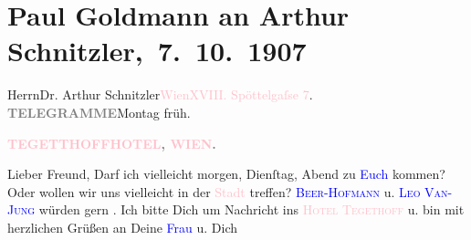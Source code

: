 

\renewcommand{\erwaehntePersonen}{Personen: Richard Beer-Hofmann, Olga Schnitzler, Leo Van-Jung}
\renewcommand{\erwaehnteOrte}{Orte: Edmund-Weiß-Gasse, Hotel Tegetthoff, Wien}
\renewcommand{\erwaehnteWerke}{}
\section[ Paul Goldmann an Arthur Schnitzler, 7. 10. 1907]{Paul Goldmann an Arthur Schnitzler, 7. 10. 1907}
\nopagebreak{}
\rehead{ }\normalsize\beginnumbering{}
\toendnotes[C]{\smallbreak\pagebreak[2]}
\toendnotes[C]{\smallbreak}\pstart{}{\pb}Herrn\pend{}\pstart{}Dr. Arthur Schnitzler\pend{}\pstart{}\textcolor{pink}{Wien}{}\ledrightnote{\textcolor{pink}{Wien}}\pend{}\pstart{}\textcolor{pink}{XVIII. Spöttelgaſse 7}{}\ledrightnote{\textcolor{pink}{Edmund-Weiß-Gasse}}.\pend{}
{\bigskip}
\pstart
           \noindent{}{\pb}\textcolor{gray}{\textbf{TELEGRAMME}}\hfill Montag{ }früh.\pend
           
\pstart
           \textcolor{gray}{\textbf{\textcolor{pink}{TEGETTHOFFHOTEL}{}\ledrightnote{\textcolor{pink}{Hotel Tegetthoff}}, \textcolor{pink}{WIEN}{}\ledrightnote{\textcolor{pink}{Wien}}.}}\pend
           
\pstart
           Lieber Freund, Darf ich vielleicht morgen, Dienſtag, Abend zu \textcolor{blue}{Euch}{}\ledrightnote{{$\rightarrow$}\textcolor{blue}{Olga Schnitzler}} kommen? Oder wollen wir uns vielleicht
               in der \textcolor{pink}{Stadt}{}\ledrightnote{{$\rightarrow$}\textcolor{pink}{Wien}} treffen? \textsc{\textcolor{blue}{Beer-Hofmann}{}\ledrightnote{\textcolor{blue}{Richard Beer-Hofmann}}} u. \textsc{\textcolor{blue}{Leo Van-Jung}{}\ledrightnote{\textcolor{blue}{Leo Van-Jung}}} würden gern \label{K-L03253-1v}\label{K-L03253-1h}. Ich bitte Dich um Nachricht ins \textsc{\textcolor{pink}{Hotel Tegethoff}{}\ledrightnote{\textcolor{pink}{Hotel Tegetthoff}}} u. bin mit herzlichen Grüßen an Deine \textcolor{blue}{Frau}{}\ledrightnote{{$\rightarrow$}\textcolor{blue}{Olga Schnitzler}} u. Dich\pend
           
